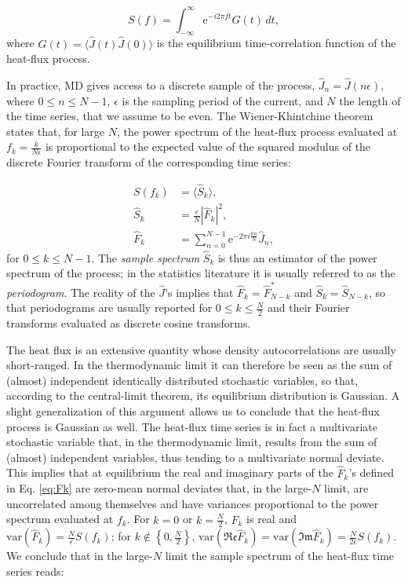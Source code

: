 \begin{equation}
S(f)=\int_{-\infty}^{\infty}\! \mathrm{e}^{-i2\pi f t}G(t)\, dt,\label{eq:power-spectrum}
\end{equation}
where $G(t)=\langle\hat{J}(t)\hat{J}(0)\rangle$ is the equilibrium time-correlation function of the heat-flux process.

In practice, MD gives access to a discrete sample of the process, $\hat{J}_{n}=\hat{J}(n\epsilon)$, where $0 \leq n \leq N-1$, $\epsilon$ is the sampling period of the current, and $N$ the length of the time series, that we assume to be even. The Wiener-Khintchine theorem \cite{Wiener1930,Khintchine1934} states that, for large $N$, the power spectrum of the heat-flux process evaluated at $f_k=\frac{k}{N\epsilon}$ is proportional to the expected value of the squared modulus of the discrete Fourier transform of the corresponding time series:

\begin{align}
S(f_k)&=\langle \hat S_k \rangle, \label{eq:S-unbiased}\\
\hat{S}_{k}&=\frac{\epsilon}{N} \left |\hat{F}_{k} \right |^2, \label{eq:periodogram-def}\\
\hat{F}_{k}&=\sum_{n=0}^{N-1}\mathrm{e}^{-2\pi i\frac{kn}{N}}\hat{J}_n, \label{eq:Fk}
\end{align}
for $0 \leq k \leq N-1$. The \emph{sample spectrum} $\hat S_k$ is thus an estimator of the power spectrum of the process; in the statistics literature it is usually referred to as the \emph{periodogram}. The reality of the $\hat J$'s implies that $\hat F_k=\hat F^*_{N-k}$ and $\hat S_k=\hat S_{N-k}$, so that periodograms are usually reported for $0\leq k\leq \frac{N}{2}$ and their Fourier transforms evaluated as discrete cosine transforms.

The heat flux is an extensive quantity whose density autocorrelations are usually short-ranged. In the thermodynamic limit it can therefore be seen as the sum of (almost) independent identically distributed stochastic variables, so that, according to the central-limit theorem, its equilibrium distribution is Gaussian. A slight generalization of this argument allows us to conclude that the heat-flux process is Gaussian as well. The heat-flux time series is in fact a multivariate stochastic variable that, in the thermodynamic limit, results from the sum of (almost) independent variables, thus tending to a multivariate normal deviate. This implies that at equilibrium the real and imaginary parts of the $\hat F_k$'s defined in Eq. \eqref{eq:Fk} are zero-mean normal deviates that, in the large-$N$ limit, are uncorrelated among themselves and have variances proportional to the power spectrum evaluated at $f_k$. For $k=0$ or $k=\frac{N}{2}$, $\hat F_k$ is real and $\mathrm{var} (\hat F_k)=\frac{N}{\epsilon}S(f_k)$; for $k\notin\left\{ 0,\frac{N}{2}\right\}$, $\mathrm{var}(\mathfrak{Re}\hat{F}_k)= \mathrm{var}(\mathfrak{Im}\hat{F}_k) = \frac{N}{2\epsilon}S(f_k)$.  We conclude that in the large-$N$ limit the sample spectrum of the heat-flux time series reads:

